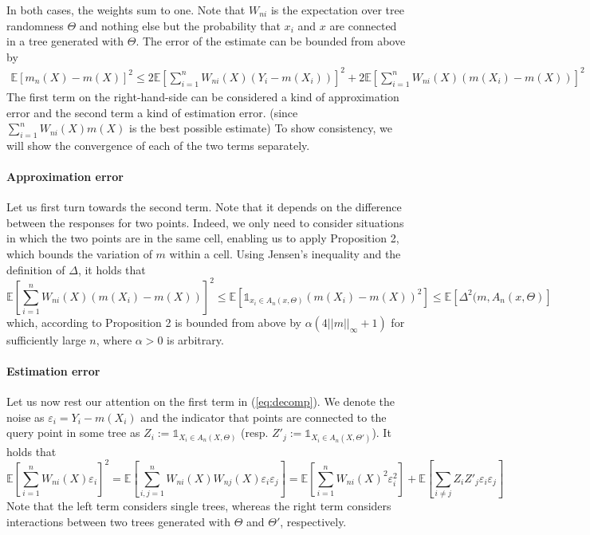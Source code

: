 \documentclass[10pt]{article}
\theoremstyle{definition}
\begin{document}
In both cases, the weights sum to one. Note that $W_{ni}$ is the expectation over
tree randomness $\Theta$ and nothing else but the
probability that $x_{i}$ and $x$ are connected in a tree generated with
$\Theta$. The error of the estimate can be bounded from above by
\begin{align}
\mathbb{E}\left[m_{n}(X) - m(X) \right]^2 \leq 
2 \mathbb{E}\left[ \sum_{i=1}^n W_{ni}(X)(Y_{i}-m(X_{i})) \right]^2 + 
2 \mathbb{E}\left[ \sum_{i=1}^n W_{ni}(X)(m(X_{i})-m(X)) \right]^2 
  \label{eq:decomp}
\end{align}
The first term on the right-hand-side can be considered a kind of
approximation error and the second term a kind of estimation error.
(since $\sum_{i=1}^n W_{ni}(X)m(X)$ is the best possible estimate)
To show consistency, we will show the convergence of each of the two terms separately.

\paragraph{Approximation error} Let us first turn towards the second term. Note
that it depends on the difference between the responses for two points. Indeed,
we only need to consider situations in which the two points are in the same
cell, enabling us to apply Proposition 2, which bounds the variation of $m$ within
a cell. Using Jensen's inequality and the definition of $\Delta$, it holds that
$$
\mathbb{E}\left[ \sum_{i=1}^n W_{ni}(X)(m(X_{i})-m(X)) \right]^2 \leq
\mathbb{E}\left[ \mathbb{1}_{x_{i} \in A_{n}(x, \Theta)} (m(X_{i}) - m(X))^2 \right]
\leq
\mathbb{E}\left[\Delta^2(m, A_{n}(x, \Theta)\right]
$$
which, according to Proposition 2 is bounded from above by $\alpha(4 \lvert \lvert
m \rvert \rvert_{\infty} + 1)$ for sufficiently large $n$, where $\alpha > 0$ is arbitrary.

\paragraph{Estimation error} Let us now rest our attention on the first term in
(\ref{eq:decomp}). We denote the noise as $\varepsilon_{i} = Y_{i}-m(X_{i})$ and the
indicator that points are connected to the query point in some tree as $Z_{i} :=
\mathbb{1}_{X_{i} \in A_{n}(X, \Theta)}$ (resp. $Z'_{j} := \mathbb{1}_{X_{i}\in
  A_{n}(X, \Theta')}$). It holds that
$$
\mathbb{E}\left[ \sum_{i=1}^n W_{ni}(X)\varepsilon_{i} \right]^2 
= \mathbb{E}\left[
\sum_{i,j=1}^n   W_{ni}(X)  W_{nj}(X) \varepsilon_{i} \varepsilon_{j}
\right]
= 
 \mathbb{E}\left[ \sum_{i=1}^n  W_{ni}(X)^2 \varepsilon_{i}^2  \right] 
 +  \mathbb{E}\left[ \sum_{i \not= j} Z_{i} Z'_{j} \varepsilon_{i} \varepsilon_{j}  \right]
$$
Note that the left term considers single trees, whereas
the right term considers interactions between two trees generated with $\Theta$
and $\Theta'$, respectively.
\end{document}
